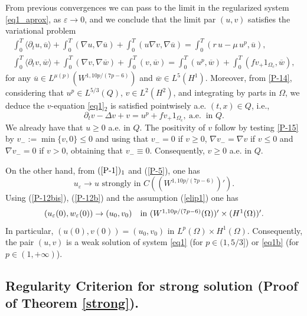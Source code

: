 \documentclass[11pt,reqno]{amsart}%
\numberwithin{equation}{section}
\begin{document}
{From previous convergences we can pass to the limit in the regularized system \eqref{eq1_aprox}, as $\varepsilon\to0$, and we conclude that the limit par  $(u,v)$ satisfies the variational problem 
\begin{eqnarray}
\int_0^T\langle\partial_tu,\overline{u}\rangle+\int_0^T(\nabla u,\nabla\overline{u})+\int_0^T(u\nabla v,\nabla\overline{u})=
\int_0^T(r\, u-\mu\, u^p,\overline{u}),\label{P-13}\\
\int_0^T\langle\partial_tv,\overline{w}\rangle+\int_0^T(\nabla v,\nabla\overline{w})+\int_0^T(v,\overline{w})
=\int_0^T(u^p,\overline{w})+\int_0^T(fv_+1_{\Omega_c},\overline{w}),\label{P-14}
\end{eqnarray}
for any $\overline{u}\in L^{\mu(p)}(W^{1,10p/(7p-6)})$ and 
$\overline{w}\in L^{5}(H^1)$. 
 Moreover, from \eqref{P-14}, considering that $u^p\in L^{5/3}(Q)$, $v\in L^2(H^2)$, and  integrating by parts in $\Omega$, we deduce the $v$-equation \eqref{eq1}$_2$ is satisfied   pointwisely a.e. $(t,x)\in Q$, i.e.,
\begin{equation}\label{P-15}
\partial_tv-\Delta v+v=u^p+fv_+1_{\Omega_c},\ \mbox{a.e.}\  \mbox{ in $Q$}.
\end{equation}
We already have that $u\ge0$ a.e. in $Q$. The positivity of $v$ follow by testing \eqref{P-15} by $v_-:=\min\{v,0\}\le0$ and using that $v_-=0$ if $v\ge0$, $\nabla v_-=\nabla v$ if $v\le0$ and $\nabla v_-=0$ if $v>0$, obtaining that $v_-\equiv0$. Consequently, $v\ge0$ a.e. in $Q$.  

On the other hand,  from $(\ref{P-1})_1$ and (\ref{P-5}), one has 
\begin{equation}\label{P-12bis}
u_\varepsilon\to u\mbox{ strongly in }  C((W^{1,10p/(7p-6)})').
\end{equation}
Using (\ref{P-12bis}), (\ref{P-12b}) and the assumption (\ref{elip1}) one has 
$$(u_\varepsilon(0),w_\varepsilon(0)) \to (u_0,v_0)\quad  \hbox{in $(W^{1,10p/(7p-6)} (\Omega))'\times (H^1(\Omega))'$}.$$
 In particular,  $(u(0),v(0))= (u_0,v_0)$ in $L^p(\Omega)\times H^1(\Omega)$. Consequently, the pair $(u,v)$ is a weak solution of system \eqref{eq1} (for $p\in(1,5/3]$) or \eqref{eq1b} (for $p\in(1,+\infty)$).




\subsection{Regularity Criterion for strong solution (Proof of Theorem \ref{strong}).} \label{seccionCriterium}

}
\end{document}
